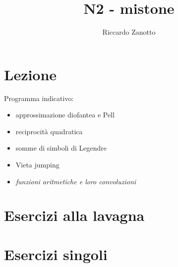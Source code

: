 \documentclass[12pt]{article}
\author{Riccardo Zanotto}
\title{N2 - mistone}
\begin{document}
\maketitle


\section{Lezione}

Programma indicativo:

\begin{itemize}
    \item approssimazione diofantea e Pell
    \item reciprocità quadratica
    \item somme di simboli di Legendre
    \item Vieta jumping
    \item \textit{funzioni aritmetiche e loro convoluzioni}
\end{itemize}

\section{Esercizi alla lavagna}

\section{Esercizi singoli}
\end{document}
